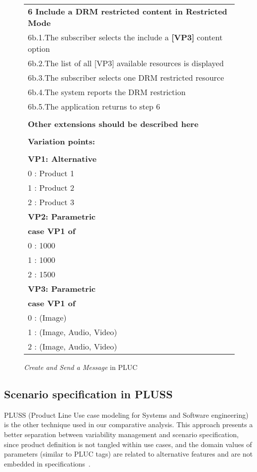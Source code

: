 \documentclass{acm_proc_article-sp}
\begin{document}
\begin{figure}[t]
\begin{center}
\begin{tiny}
{{\begin{tabular}{l}
{\bf 6 Include a DRM restricted content in Restricted Mode} \\
6b.1.The subscriber selects the include a {\bf [VP3]} content option \\
6b.2.The list of all [VP3] available resources is displayed \\
6b.3.The subscriber selects one DRM restricted resource \\
6b.4.The system reports the DRM restriction \\
6b.5.The application returns to step 6 \\ \\
{\bf Other extensions should be described here} \\ \\
{\bf Variation points: } \\ \\
   {\bf VP1: Alternative} \\
      0 : Product 1 \\
      1 : Product 2 \\
      2 : Product 3 \\
   {\bf VP2: Parametric} \\
      {\bf case VP1 of} \\
       0 : 1000 \\
       1 : 1000 \\
       2 : 1500 \\
   {\bf VP3: Parametric} \\
      {\bf case VP1 of} \\
       0 : (Image) \\
       1 : (Image, Audio, Video) \\
       2 : (Image, Audio, Video) \\    
   \end{tabular}
  } }
\end{tiny}
\end{center}
\caption{\emph{Create and Send a Message} in PLUC}
\label{fig:pluc-01}

\end{figure}

\subsection{Scenario specification in PLUSS}
\label{sub:pluss}

PLUSS (Product Line Use case modeling for Systems and Software engineering) is the other technique used in our comparative analysis. This approach presents a better separation 
between variability management and scenario specification, since product definition is not tangled within use cases, 
and the domain values of parameters (similar to PLUC tags) are related to alternative features and are 
not embedded in specifications~\cite{eriksson-splc-2005}. 
\end{document}
